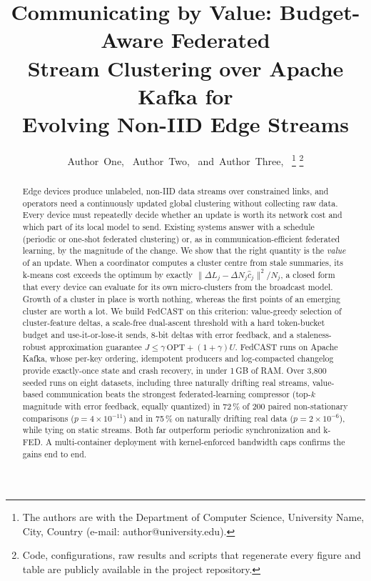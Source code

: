 \documentclass[journal]{IEEEtran}
\begin{document}
\title{Communicating by Value: Budget-Aware Federated\\ Stream Clustering over Apache Kafka for\\ Evolving Non-IID Edge Streams}

\author{Author~One,~
        Author~Two,~
        and~Author~Three,~%
\thanks{The authors are with the Department of Computer Science, University Name, City, Country (e-mail: author@university.edu).}%
\thanks{Code, configurations, raw results and scripts that regenerate every figure and table are publicly available in the project repository.}}


\maketitle

\begin{abstract}
Edge devices produce unlabeled, non-IID data streams over constrained links, and operators need a continuously updated global clustering without collecting raw data. Every device must repeatedly decide whether an update is worth its network cost and which part of its local model to send. Existing systems answer with a schedule (periodic or one-shot federated clustering) or, as in communication-efficient federated learning, by the magnitude of the change. We show that the right quantity is the \emph{value} of an update. When a coordinator computes a cluster centre from stale summaries, its k-means cost exceeds the optimum by exactly $\|\Delta L_j-\Delta N_j\hat c_j\|^2/N_j$, a closed form that every device can evaluate for its own micro-clusters from the broadcast model. Growth of a cluster in place is worth nothing, whereas the first points of an emerging cluster are worth a lot. We build FedCAST on this criterion: value-greedy selection of cluster-feature deltas, a scale-free dual-ascent threshold with a hard token-bucket budget and use-it-or-lose-it sends, 8-bit deltas with error feedback, and a staleness-robust approximation guarantee $J\le\gamma\,\mathrm{OPT}+(1+\gamma)U$. FedCAST runs on Apache Kafka, whose per-key ordering, idempotent producers and log-compacted changelog provide exactly-once state and crash recovery, in under 1\,GB of RAM. Over 3{,}800 seeded runs on eight datasets, including three naturally drifting real streams, value-based communication beats the strongest federated-learning compressor (top-$k$ magnitude with error feedback, equally quantized) in 72\,\% of 200 paired non-stationary comparisons ($p=4\times10^{-11}$) and in 75\,\% on naturally drifting real data ($p=2\times10^{-6}$), while tying on static streams. Both far outperform periodic synchronization and k-FED. A multi-container deployment with kernel-enforced bandwidth caps confirms the gains end to end.
\end{abstract}
\end{document}
